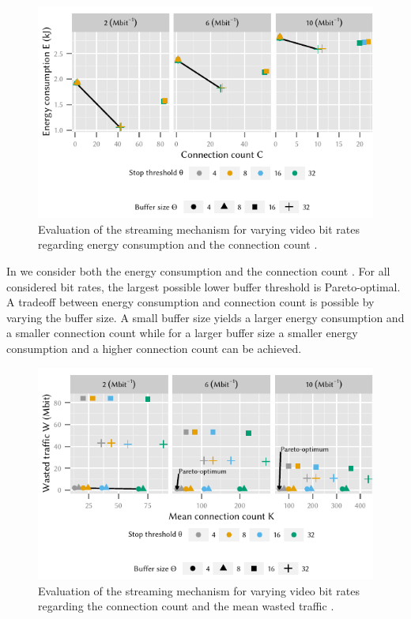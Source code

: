 \begin{figure}
  \centering
  \includegraphics{application/lte_video/trade_offs/figures/energy2connections}
  \caption{Evaluation of the streaming mechanism for varying video bit rates \bitrate regarding energy consumption \energyconsumption and the connection count \connectioncount.}
  \label{fig:application:lte_video:numerical_evaluation:trade_offs:energy2connections}
\end{figure}

In  we consider both the energy consumption \energyconsumption and the connection count \connectioncount.
For all considered bit rates, the largest possible lower buffer threshold is Pareto-optimal.
A tradeoff between energy consumption \energyconsumption and connection count \connectioncount is possible by varying the buffer size.
A small buffer size yields a larger energy consumption \energyconsumption and a smaller connection count \connectioncount while for a larger buffer size a smaller energy consumption \energyconsumption and a higher connection count \connectioncount can be achieved.

\begin{figure}
  \centering
  \includegraphics{application/lte_video/trade_offs/figures/connections2lostData}
  \caption{Evaluation of the streaming mechanism for varying video bit rates \bitrate regarding the connection count \connectioncount and the mean wasted traffic \meanwastedtraffic.}
  \label{fig:application:lte_video:numerical_evaluation:trade_offs:connections2lostData}
\end{figure}

